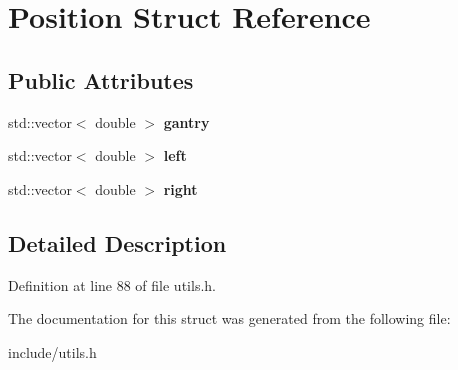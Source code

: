 \hypertarget{structPosition}{}\section{Position Struct Reference}
\label{structPosition}
\subsection*{Public Attributes}
\begin{DoxyCompactItemize}
\item 
\mbox{\label{structPosition_a506a046a9a58d3aae47d637aee0ea432}} 
std\+::vector$<$ double $>$ {\bfseries gantry}
\item 
\mbox{\label{structPosition_a31a63b03b11c8b38820596aa75fbc70f}} 
std\+::vector$<$ double $>$ {\bfseries left}
\item 
\mbox{\label{structPosition_a4212665c40ee3db37d21dd0925b252e8}} 
std\+::vector$<$ double $>$ {\bfseries right}
\end{DoxyCompactItemize}


\subsection{Detailed Description}


Definition at line 88 of file utils.\+h.



The documentation for this struct was generated from the following file\+:\begin{DoxyCompactItemize}
\item 
include/utils.\+h\end{DoxyCompactItemize}
